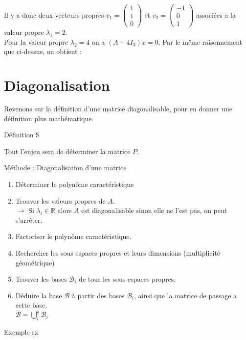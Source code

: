 \begin{ex}
Il y a donc deux vecteurs propres $v_1=\begin{pmatrix}1\\1\\0\end{pmatrix}$ et $v_2=\begin{pmatrix}-1\\0\\1\end{pmatrix}$ associées a la valeur propre $\lambda_1=2$.\\
Pour la valeur propre $\lambda_2=4$ on a $(A-4I_3)x=0$.
Par le même raisonnement que ci-dessus, on obtient :
\end{ex}


\section{Diagonalisation}
Revenons sur la définition d'une matrice diagonalisable, pour en donner une définition plus mathématique.
\begin{bclogo}[couleur=blue!30,couleurBord=blue,arrondi=0.1,logo=\bcbook,ombre=true]{Définition}
S
\end{bclogo}

Tout l'enjeu sera de déterminer la matrice $P$.

\begin{bclogo}[logo=\bclampe,arrondi=0.1,ombre=true, couleur=yellow!60,couleurBord=yellow]{Méthode : Diagonalisation d'une matrice}
\begin{enumerate}
    \item Déterminer le polynôme caractéristique
    \item Trouver les valeurs propres de $A$.\\
    $\rightarrow$ Si $\lambda_i\in\mathbb{R}$ alors $A$ est diagonalisable sinon elle ne l'est pas, on peut s'arrêter.
    \item Factoriser le polynôme caractéristique.
    \item Rechercher les sous espaces propres et leurs dimensions (multiplicité géométrique)
    \item Trouver les bases $\mathscr{B}_i$ de tous les sous espaces propres.
    \item Déduire la base $\mathscr{B}$ à partir des bases $\mathscr{B}_i$,
    ainsi que la matrice de passage a cette base.\\
    $\mathscr{B} =\bigcup_{i}^{k}\mathscr{B}_i$
\end{enumerate}
\end{bclogo}
\begin{bclogo}[logo=\bccrayon,noborder=true,barre=snake]{Exemple}
rx
\end{bclogo}
